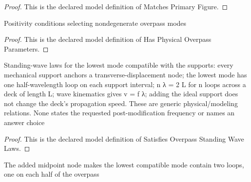 \begin{proof}
  This is the declared model definition of Matches Primary Figure.
\end{proof}
\begin{definition}
  \label{def:physics:phyx-mini-0210:phyxminiproblems-problemphyxmini0210-hasphysicaloverpassparameters}
  Positivity conditions selecting nondegenerate overpass modes
\end{definition}
\begin{proof}
  This is the declared model definition of Has Physical Overpass Parameters.
\end{proof}
\begin{definition}
  \label{def:physics:phyx-mini-0210:phyxminiproblems-problemphyxmini0210-satisfiesoverpassstandingwavelaws}
  Standing-wave laws for the lowest mode compatible with the supports: every mechanical support anchors a transverse-displacement node; the lowest mode has one half-wavelength loop on each support interval; n λ = 2 L for n loops across a deck of length L; wave kinematics gives v = f λ; adding the ideal support does not change the deck's propagation speed. These are generic physical/modeling relations. None states the requested post-modification frequency or names an answer choice
\end{definition}
\begin{proof}
  This is the declared model definition of Satisfies Overpass Standing Wave Laws.
\end{proof}
\begin{lemma}
  \label{lem:physics:phyx-mini-0210:phyxminiproblems-problemphyxmini0210-postmodificationloopcount-eq-two}
  The added midpoint node makes the lowest compatible mode contain two loops, one on each half of the overpass
\end{lemma}

